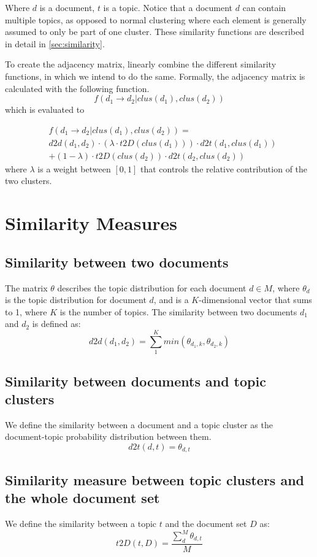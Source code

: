 \noindent
Where $d$ is a document, $t$ is a topic.
Notice that a document $d$ can contain multiple topics, as opposed to normal clustering where each element is generally assumed to only be part of one cluster.
These similarity functions are described in detail in \autoref{sec:similarity}.

To create the adjacency matrix, \cite{ClusterPageRank} linearly combine the different similarity functions, in which we intend to do the same.
Formally, the adjacency matrix is calculated with the following function.
$$ f(d_1 \rightarrow d_2 | clus(d_1), clus(d_2)) $$
which is evaluated to 

\begin{align*}
&f(d_1 \rightarrow d_2 | clus(d_1), clus(d_2)) = \\
&d2d(d_1, d_2) \cdot (\lambda \cdot t2D(clus(d_1))) \cdot d2t(d_1, clus(d_1)) \\ 
&+ (1-\lambda) \cdot t2D(clus(d_2)) \cdot d2t(d_2, clus(d_2))
\end{align*}
where $\lambda$ is a weight between $[0,1]$ that controls the relative contribution of the two clusters.


\section{Similarity Measures}\label{sec:similarity}
\subsection{Similarity between two documents}
The matrix $\theta$ describes the topic distribution for each document $d \in M$, where $\theta_d$ is the topic distribution for document $d$, and is a $K$-dimensional vector that sums to 1, where $K$ is the number of topics. 
The similarity between two documents $d_1$ and $d_2$ is defined as:
$$ d2d(d_1, d_2) = \sum_{1}^{K} min(\theta_{d_1,k}, \theta_{d_2,k})$$

\subsection{Similarity between documents and topic clusters}
We define the similarity between a document and a topic cluster as the document-topic probability distribution between them.
$$ d2t(d,t) = \theta_{d,t}$$

\subsection{Similarity measure between topic clusters and the whole document set}
We define the similarity between a topic $t$ and the document set $D$ as:
$$ t2D(t, D) = \frac{\sum_{d}^{M} \theta_{d,t}}{M} $$
